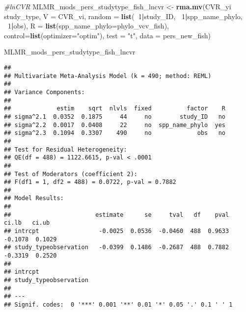 \documentclass[]{article}
\newenvironment{Shaded}{\begin{snugshade}}{\end{snugshade}}
\newcommand{\KeywordTok}[1]{\textcolor[rgb]{0.13,0.29,0.53}{\textbf{#1}}}
\newcommand{\DataTypeTok}[1]{\textcolor[rgb]{0.13,0.29,0.53}{#1}}
\newcommand{\DecValTok}[1]{\textcolor[rgb]{0.00,0.00,0.81}{#1}}
\newcommand{\StringTok}[1]{\textcolor[rgb]{0.31,0.60,0.02}{#1}}
\newcommand{\CommentTok}[1]{\textcolor[rgb]{0.56,0.35,0.01}{\textit{#1}}}
\newcommand{\OperatorTok}[1]{\textcolor[rgb]{0.81,0.36,0.00}{\textbf{#1}}}
\newcommand{\NormalTok}[1]{#1}
\begin{document}
\begin{Shaded}
\begin{Highlighting}[]
      \CommentTok{#lnCVR}
\NormalTok{      MLMR_mods_pers_studytype_fish_lncvr <-}\StringTok{ }\KeywordTok{rma.mv}\NormalTok{(CVR_yi }\OperatorTok{~}\StringTok{ }\NormalTok{study_type, }\DataTypeTok{V =}\NormalTok{ CVR_vi, }
                                            \DataTypeTok{random =} \KeywordTok{list}\NormalTok{(}\OperatorTok{~}\DecValTok{1}\OperatorTok{|}\NormalTok{study_ID, }\OperatorTok{~}\DecValTok{1}\OperatorTok{|}\NormalTok{spp_name_phylo, }\OperatorTok{~}\DecValTok{1}\OperatorTok{|}\NormalTok{obs), }
                                            \DataTypeTok{R =} \KeywordTok{list}\NormalTok{(}\DataTypeTok{spp_name_phylo=}\NormalTok{phylo_vcv_fish), }\DataTypeTok{control=}\KeywordTok{list}\NormalTok{(}\DataTypeTok{optimizer=}\StringTok{"optim"}\NormalTok{), }
                                            \DataTypeTok{test =} \StringTok{"t"}\NormalTok{, }\DataTypeTok{data =}\NormalTok{ pers_new_fish)}

\NormalTok{      MLMR_mods_pers_studytype_fish_lncvr}
\end{Highlighting}
\end{Shaded}

\begin{verbatim}
## 
## Multivariate Meta-Analysis Model (k = 490; method: REML)
## 
## Variance Components:
## 
##             estim    sqrt  nlvls  fixed          factor    R 
## sigma^2.1  0.0352  0.1875     44     no        study_ID   no 
## sigma^2.2  0.0017  0.0408     22     no  spp_name_phylo  yes 
## sigma^2.3  0.1094  0.3307    490     no             obs   no 
## 
## Test for Residual Heterogeneity:
## QE(df = 488) = 1122.6615, p-val < .0001
## 
## Test of Moderators (coefficient 2):
## F(df1 = 1, df2 = 488) = 0.0722, p-val = 0.7882
## 
## Model Results:
## 
##                        estimate      se     tval   df    pval    ci.lb   ci.ub 
## intrcpt                 -0.0025  0.0536  -0.0460  488  0.9633  -0.1078  0.1029 
## study_typeobservation   -0.0399  0.1486  -0.2687  488  0.7882  -0.3319  0.2520 
##  
## intrcpt 
## study_typeobservation 
## 
## ---
## Signif. codes:  0 '***' 0.001 '**' 0.01 '*' 0.05 '.' 0.1 ' ' 1
\end{verbatim}
\end{document}
